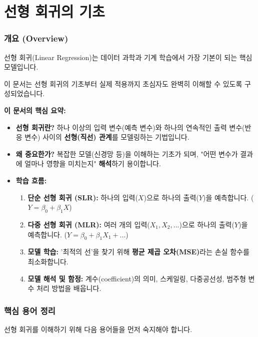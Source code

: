 \documentclass[11pt,a4paper]{book}
\theoremstyle{definition}
\begin{document}
\part{선형 회귀의 기초}

\section{개요 (Overview)}

선형 회귀(Linear Regression)는 데이터 과학과 기계 학습에서 가장 기본이 되는 핵심 모델입니다.

이 문서는 선형 회귀의 기초부터 실제 적용까지 초심자도 완벽히 이해할 수 있도록 구성되었습니다.

\begin{summarybox}
\textbf{이 문서의 핵심 요약:}
\begin{itemize}
    \item \textbf{선형 회귀란?} 하나 이상의 입력 변수(예측 변수)와 하나의 연속적인 출력 변수(반응 변수) 사이의 \textbf{선형(직선) 관계}를 모델링하는 기법입니다.
    \item \textbf{왜 중요한가?} 복잡한 모델(신경망 등)을 이해하는 기초가 되며, "어떤 변수가 결과에 얼마나 영향을 미치는지" \textbf{해석}하기 용이합니다.
    \item \textbf{학습 흐름:}
        \begin{enumerate}
            \item \textbf{단순 선형 회귀 (SLR):} 하나의 입력($X$)으로 하나의 출력($Y$)을 예측합니다. ($Y = \beta_0 + \beta_1 X$)
            \item \textbf{다중 선형 회귀 (MLR):} 여러 개의 입력($X_1, X_2, ...$)으로 하나의 출력($Y$)을 예측합니다. ($Y = \beta_0 + \beta_1 X_1 + ...$)
            \item \textbf{모델 학습:} '최적의 선'을 찾기 위해 \textbf{평균 제곱 오차(MSE)}라는 손실 함수를 최소화합니다.
            \item \textbf{모델 해석 및 함정:} 계수(coefficient)의 의미, 스케일링, 다중공선성, 범주형 변수 처리 방법을 배웁니다.
        \end{enumerate}
\end{itemize}
\end{summarybox}

\section{핵심 용어 정리}
선형 회귀를 이해하기 위해 다음 용어들을 먼저 숙지해야 합니다.
\end{document}
